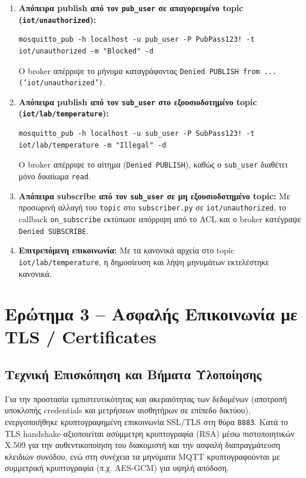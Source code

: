 \documentclass[11pt, a4paper]{article}
\begin{document}
\begin{enumerate}
    \item \textbf{Απόπειρα publish από τον \texttt{pub\_user} σε απαγορευμένο topic (\texttt{iot/unauthorized}):}
\begin{lstlisting}[language={}]
mosquitto_pub -h localhost -u pub_user -P PubPass123! -t iot/unauthorized -m "Blocked" -d
\end{lstlisting}
    Ο broker απέρριψε το μήνυμα καταγράφοντας \texttt{Denied PUBLISH from ... ('iot/unauthorized')}.
    \item \textbf{Απόπειρα publish από τον \texttt{sub\_user} στο εξουσιοδοτημένο topic (\texttt{iot/lab/temperature}):}
\begin{lstlisting}[language={}]
mosquitto_pub -h localhost -u sub_user -P SubPass123! -t iot/lab/temperature -m "Illegal" -d
\end{lstlisting}
    Ο broker απέρριψε το αίτημα (\texttt{Denied PUBLISH}), καθώς ο \texttt{sub\_user} διαθέτει μόνο δικαίωμα \texttt{read}.
    \item \textbf{Απόπειρα subscribe από τον \texttt{sub\_user} σε μη εξουσιοδοτημένο topic:} Με προσωρινή αλλαγή του \texttt{topic} στο \texttt{subscriber.py} σε \texttt{iot/unauthorized}, το callback \texttt{on\_subscribe} εκτύπωσε απόρριψη από το ACL και ο broker κατέγραψε \texttt{Denied SUBSCRIBE}.
    \item \textbf{Επιτρεπόμενη επικοινωνία:} Με τα κανονικά αρχεία στο topic \texttt{iot/lab/temperature}, η δημοσίευση και λήψη μηνυμάτων εκτελέστηκε κανονικά.
\end{enumerate}

\section{Ερώτημα 3 -- Ασφαλής Επικοινωνία με TLS / Certificates}

\subsection{Τεχνική Επισκόπηση και Βήματα Υλοποίησης}
Για την προστασία εμπιστευτικότητας και ακεραιότητας των δεδομένων (αποτροπή υποκλοπής credentials και μετρήσεων αισθητήρων σε επίπεδο δικτύου), ενεργοποιήθηκε κρυπτογραφημένη επικοινωνία SSL/TLS στη θύρα \texttt{8883}. Κατά το TLS handshake αξιοποιείται ασύμμετρη κρυπτογραφία (RSA) μέσω πιστοποιητικών X.509 για την αυθεντικοποίηση του διακομιστή και την ασφαλή διαπραγμάτευση κλειδιών συνόδου, ενώ στη συνέχεια τα μηνύματα MQTT κρυπτογραφούνται με συμμετρική κρυπτογραφία (π.χ. AES-GCM) για υψηλή απόδοση.
\end{document}
